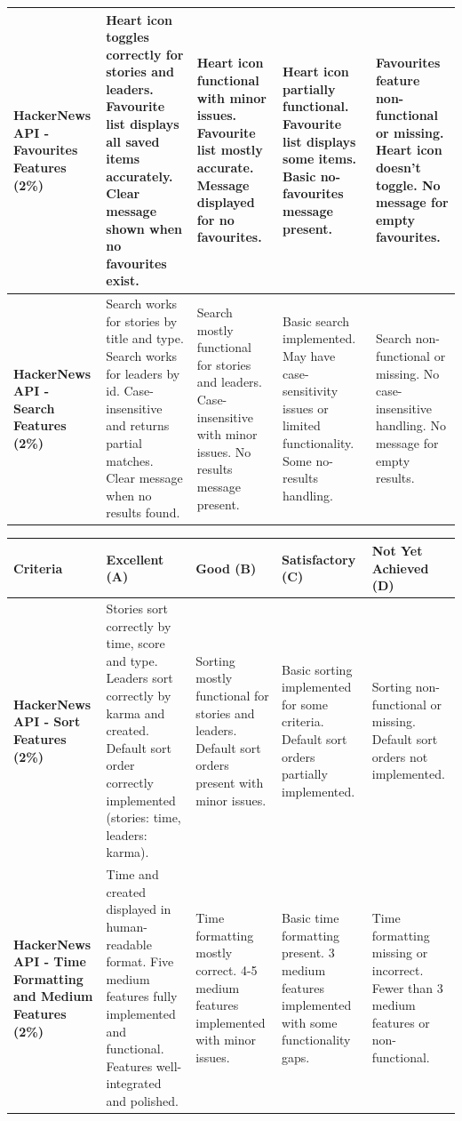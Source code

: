\documentclass{article}
\begin{document}
\begin{landscape}
\begin{tabular}{|p{5cm}|p{4cm}|p{4cm}|p{4cm}|p{4cm}|}
\textbf{HackerNews API - Favourites Features (2\%)} & 
Heart icon toggles correctly for stories and leaders. Favourite list displays all saved items accurately. Clear message shown when no favourites exist. & 
Heart icon functional with minor issues. Favourite list mostly accurate. Message displayed for no favourites. & 
Heart icon partially functional. Favourite list displays some items. Basic no-favourites message present. & 
Favourites feature non-functional or missing. Heart icon doesn't toggle. No message for empty favourites. \\ \hline

\textbf{HackerNews API - Search Features (2\%)} & 
Search works for stories by title and type. Search works for leaders by id. Case-insensitive and returns partial matches. Clear message when no results found. & 
Search mostly functional for stories and leaders. Case-insensitive with minor issues. No results message present. & 
Basic search implemented. May have case-sensitivity issues or limited functionality. Some no-results handling. & 
Search non-functional or missing. No case-insensitive handling. No message for empty results. \\ \hline

\end{tabular}

\begin{tabular}{|p{5cm}|p{4cm}|p{4cm}|p{4cm}|p{4cm}|}
\hline
\textbf{Criteria} & \textbf{Excellent (A)} & \textbf{Good (B)} & \textbf{Satisfactory (C)} & \textbf{Not Yet Achieved (D)} \\ \hline

\textbf{HackerNews API - Sort Features (2\%)} & 
Stories sort correctly by time, score and type. Leaders sort correctly by karma and created. Default sort order correctly implemented (stories: time, leaders: karma). & 
Sorting mostly functional for stories and leaders. Default sort orders present with minor issues. & 
Basic sorting implemented for some criteria. Default sort orders partially implemented. & 
Sorting non-functional or missing. Default sort orders not implemented. \\ \hline

\textbf{HackerNews API - Time Formatting and Medium Features (2\%)} & 
Time and created displayed in human-readable format. Five medium features fully implemented and functional. Features well-integrated and polished. & 
Time formatting mostly correct. 4-5 medium features implemented with minor issues. & 
Basic time formatting present. 3 medium features implemented with some functionality gaps. & 
Time formatting missing or incorrect. Fewer than 3 medium features or non-functional. \\ \hline


\end{tabular}
\end{landscape}
\end{document}
